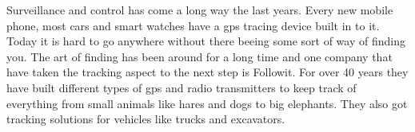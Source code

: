 

Surveillance and control has come a long way the last years. Every new mobile phone, most cars and smart watches have a \gls{gps} tracing device built in to it. Today it is hard to go anywhere without there beeing some sort of way of finding you. The art of finding has been around for a long time and one company that have taken the tracking aspect to the next step is Followit. For over 40 years they have built different types of \gls{gps} and radio transmitters to keep track of everything from small animals like hares and dogs to big elephants. They also got tracking solutions for vehicles like trucks and excavators. 


\thispagestyle{empty}